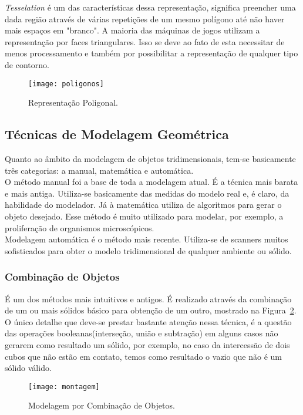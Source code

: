 \textit{Tesselation} é um das características dessa representação, significa preencher uma dada região através de várias repetições de um mesmo polígono até não haver mais espaços em "branco". A maioria das máquinas de jogos utilizam a representação por faces triangulares. Isso se deve ao fato de esta necessitar de menos processamento e também por possibilitar a representação de qualquer tipo de contorno\cite{traina}.

\begin{figure}[ht!]
      \centering
	  \texttt{[image: poligonos]}
	  \caption{Representação Poligonal.}
	  \label{fg:pilogono}
\end{figure} 

\subsection{Técnicas de Modelagem Geométrica}
Quanto ao âmbito da modelagem de objetos tridimensionais, tem-se basicamente três categorias: a manual, matemática e automática. \\

O método manual foi a base de toda a modelagem atual. É a técnica mais barata e mais antiga.  Utiliza-se basicamente das medidas do modelo real e, é claro, da habilidade do modelador. Já à matemática utiliza de algoritmos para gerar o objeto desejado. Esse método é muito utilizado para modelar, por exemplo, a proliferação de organismos microscópicos.\\

Modelagem automática é o método mais recente. Utiliza-se de scanners muitos sofisticados para obter o modelo tridimensional de qualquer ambiente ou sólido.

\subsubsection{Combinação de Objetos}
É um dos métodos mais intuitivos e antigos. É realizado através da combinação de um ou mais sólidos básico para obtenção de um outro\cite{hearn}, mostrado na Figura~\ref{fg:comb}. O  único detalhe que deve-se prestar bastante atenção nessa técnica, é a questão das operações booleanas(interseção, união e subtração) em alguns casos não gerarem como resultado um sólido, por exemplo, no caso da intercessão de dois cubos que não estão em contato, temos como resultado o vazio que não é um sólido válido.

\begin{figure}[ht!]
	\centering
	\texttt{[image: montagem]}
	\caption{Modelagem por Combinação de Objetos.}
	\label{fg:comb}
\end{figure} 

